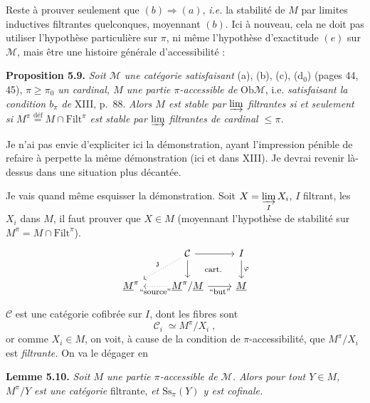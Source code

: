 \documentclass[11pt]{article}
\newcommand{\printedpage}[1]{\marginpar{\footnotesize p.~#1}}
\newcommand{\msp}[1]{\marginpar{\footnotesize [#1]}}
\newcommand{\Filt}{\mathrm{Filt}}
\newcommand{\Ob}{\mathrm{Ob}}
\newcommand{\Ss}{\mathrm{Ss}}
\newcommand{\M}{\mathcal{M}}
\newcommand{\Ci}{\mathcal{C}}
\begin{document}
Reste à prouver seulement que $(b) \Longrightarrow (a)$, \textit{i.e.} la stabilité de $M$ par limites inductives filtrantes quelconques, moyennant $(b)$. Ici à nouveau, cela ne doit pas utiliser l'hypothèse particulière sur $\pi$, ni même l'hypothèse d'exactitude $(e)$ sur $\M$, mais être une histoire générale d'accessibilité :

\textbf{Proposition 5.9.} \textit{Soit $\M$ une catégorie satisfaisant} (a), (b), (c), (d$_0$) (pages 44, 45), \textit{$\pi \geq \pi_0$ un cardinal, $M$ une partie $\pi$-accessible de} $\Ob\M$, i.e. \textit{satisfaisant la condition $b_\pi$ de} XIII, p.~88. \textit{Alors $M$ est stable par $\varinjlim$ filtrantes si et seulement si $M^\pi \overset{\text{déf}}{=} M \cap \Filt^\pi$ est stable par $\varinjlim$ filtrantes de cardinal $\leq \pi$.}

Je n'ai pas envie d'expliciter ici la démonstration, ayant l'impression pénible de refaire à perpette la même démonstration (ici et dans XIII). Je devrai revenir là-dessus dans une situation plus décantée.

\msp{page 62}

Je vais quand même esquisser la démonstration. Soit $X = \varinjlim\limits_{I} X_i$, $I$ filtrant, les $X_i$ dans $M$, il faut prouver que $X \in M$ (moyennant l'hypothèse de stabilité sur $M^\pi = M \cap \Filt^\pi$).
\printedpage{37}
\[
\begin{tikzcd}
& \Ci \arrow[r] \arrow[d] \arrow[dl, dotted, "\mathfrak{z}"'] \arrow[dr, phantom, "\text{\footnotesize cart.}"] & I \arrow[d, "\varphi"] \\
\underline{M}^\pi & \underline{M}^\pi/\underline{M} \arrow[l, dotted, "\text{\footnotesize “source”}"] \arrow[r, "\text{\footnotesize “but”}"'] & \underline{M}
\end{tikzcd}
\] %

$\Ci$ est une catégorie cofibrée sur $I$, dont les fibres sont
\[
\Ci_i \;\simeq M^\pi/X_i \;,
\]
or comme $X_i \in M$, on voit, à cause de la condition de $\pi$-accessibilité, que $M^\pi/X_i$ est \textit{filtrante.} On va le dégager en

\textbf{Lemme 5.10.} \textit{Soit $M$ une partie $\pi$-accessible de $\M$. Alors pour tout $Y \in M$, $M^\pi/Y$ est une catégorie} filtrante, \textit{et $\Ss_\pi(Y)$ y est cofinale.}

\msp{page 63}
\end{document}
